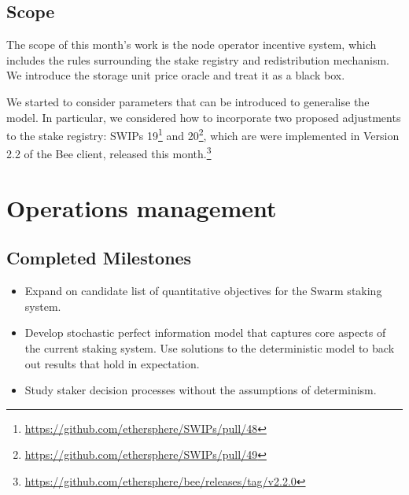 \subsection*{Scope}

The scope of this month's work is the node operator incentive system, which includes the rules surrounding the stake registry and redistribution mechanism. 
%
We introduce the storage unit price oracle and treat it as a black box.

We started to consider parameters that can be introduced to generalise the model.
%
In particular, we considered how to incorporate two proposed adjustments to the stake registry: SWIPs 19\footnote{\url{https://github.com/ethersphere/SWIPs/pull/48}} and 20\footnote{\url{https://github.com/ethersphere/SWIPs/pull/49}}, which are were implemented in Version 2.2 of the Bee client, released this month.\footnote{\url{https://github.com/ethersphere/bee/releases/tag/v2.2.0}}

\section*{Operations management}

\subsection*{Completed Milestones}

\begin{itemize}
  \item 
    Expand on candidate list of quantitative objectives for the Swarm staking system.
  \item 
    Develop stochastic perfect information model that captures core aspects of the current staking system. 
    Use solutions to the deterministic model to back out results that hold in expectation.

  \item Study staker decision processes without the assumptions of determinism.
  \end{itemize}


